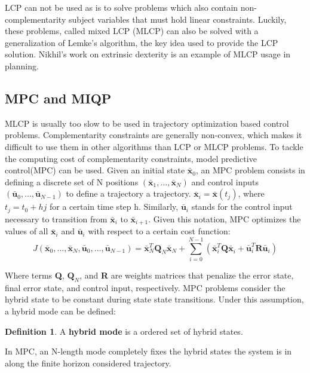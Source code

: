 \documentclass[12,twoside]{TFG-GM}
\theoremstyle{definition}
\newtheorem{definition}[theorem]{Definition}
\theoremstyle{remark}
\newcommand*\diff[1]{\bar{#1}}
\begin{document}
LCP can not be used as is to solve problems which also contain non-complementarity subject variables that must hold linear constraints. Luckily, these problems, called mixed LCP (MLCP) can also be solved with a generalization of Lemke's algorithm, the key idea used to provide the LCP solution. Nikhil's work on extrinsic dexterity \cite{nik1} is an example of MLCP usage in planning. 

\subsection{MPC and MIQP}
\label{subsec:MPC}

MLCP is usually too slow to be used in trajectory optimization based control problems. Complementarity constraints are generally non-convex, which makes it difficult to use them in other algorithms than LCP or MLCP problems. To tackle the computing cost of complementarity constraints, model predictive control(MPC) can be used. Given an initial state $\diff{\textbf{x}}_0$, an MPC problem consists in defining a discrete set of N positions $(\diff{\textbf{x}}_1, ..., \diff{\textbf{x}}_N)$ and control inputs $(\diff{\textbf{u}}_0, ..., \diff{\textbf{u}}_{N-1})$ to define a trajectory a trajectory. $\diff{\textbf{x}}_i = \diff{\textbf{x}}(t_j)$, where $t_j = t_0 + h j$ for a certain time step h. Similarly, $\diff{\textbf{u}}_i$ stands for the control input necessary to transition from $\diff{\textbf{x}}_i$ to $\diff{\textbf{x}}_{i+1}$. Given this notation, MPC optimizes the values of all $\diff{\textbf{x}}_i$ and $\diff{\textbf{u}}_i$ with respect to a certain cost function:
\begin{equation} \label{eq:cost_function}
J(\diff{\textbf{x}}_0, ..., \diff{\textbf{x}}_N, \diff{\textbf{u}}_0, ..., \diff{\textbf{u}}_{N-1}) = \diff{\textbf{x}}_N^T \textbf{Q}_N \diff{\textbf{x}}_N^{} + \sum\limits_{i = 0}^{N-1} \left( \diff{\textbf{x}}_i^T \textbf{Q} \diff{\textbf{x}}_i^{} + \diff{\textbf{u}}_{i}^T \textbf{R} \diff{\textbf{u}}_{i}^{} \right)
\end{equation}

Where terms \textbf{Q}, $\textbf{Q}_N$, and \textbf{R} are weights matrices that penalize the error state, final error state, and control input, respectively. MPC problems consider the hybrid state to be constant during state state transitions. Under this assumption, a hybrid mode can be defined:

\begin{definition} \label{def:mode} A \textbf{hybrid mode} is a ordered set of hybrid states.

In MPC, an N-length mode completely fixes the hybrid states the system is in along the finite horizon considered trajectory.
\end{definition}
\end{document}
